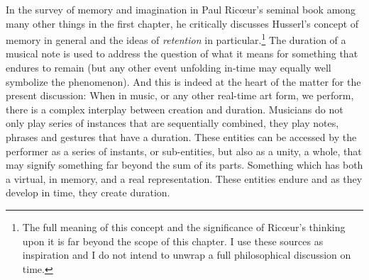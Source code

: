 In the survey of memory and imagination in Paul Ric{\oe}ur's seminal book  among many other things in the first chapter, he critically discusses Husserl's concept of memory in general and the ideas of \emph{retention} in particular.\footnote{The full meaning of this concept and the significance of Ric{\oe}ur's thinking upon it is far beyond the scope of this chapter. I use these sources as inspiration and I do not intend to unwrap a full philosophical discussion on time.} The duration of a musical note is used to address the question of what it means for something that endures to remain (but any other event unfolding in-time may equally well symbolize the phenomenon). And this is indeed at the heart of the matter for the present discussion: When in music, or any other real-time art form, we perform, there is a complex interplay between creation and duration. Musicians do not only play series of instances that are sequentially combined, they play notes, phrases and gestures that have a duration. These entities can be accessed by the performer as a series of instants, or sub-entities, but also as a unity, a whole, that may signify something far beyond the sum of its parts. Something which has both a virtual, in memory, and a real representation. These entities endure and as they develop in time, they create duration.

